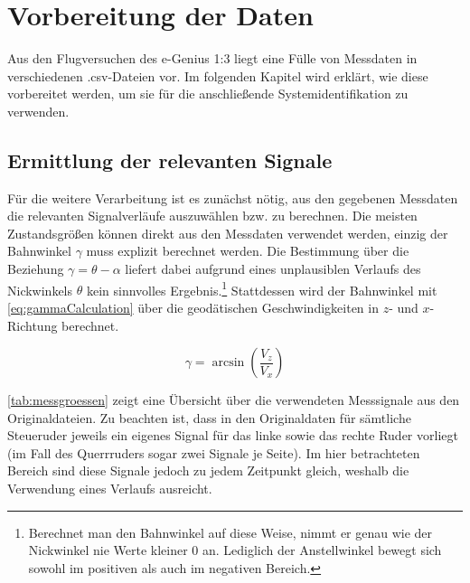 \chapter{Vorbereitung der Daten}
Aus den Flugversuchen des e-Genius 1:3 liegt eine Fülle von Messdaten in verschiedenen .csv-Dateien vor. Im folgenden Kapitel 
wird erklärt, wie diese vorbereitet werden, um sie für die anschließende Systemidentifikation zu verwenden.



\section{Ermittlung der relevanten Signale} %
Für die weitere Verarbeitung ist es zunächst nötig, aus den gegebenen Messdaten die relevanten Signalverläufe auszuwählen 
bzw. zu berechnen. Die meisten Zustandsgrößen können direkt aus den Messdaten verwendet werden, einzig der Bahnwinkel $ 
\gamma $ muss explizit berechnet werden. Die Bestimmung über die Beziehung $ \gamma=\theta-\alpha $ liefert dabei aufgrund 
eines unplausiblen Verlaufs des Nickwinkels $ \theta $ kein sinnvolles Ergebnis.\footnote{Berechnet man den Bahnwinkel auf 
diese Weise, nimmt er genau wie der Nickwinkel nie Werte kleiner 0 an. Lediglich der Anstellwinkel bewegt sich sowohl im 
positiven als auch im negativen Bereich.} Stattdessen wird der Bahnwinkel mit \cref{eq:gammaCalculation} über die 
geodätischen Geschwindigkeiten in $ z $- und $ x $-Richtung berechnet.

\begin{equation}
	\gamma = \arcsin{\left( \frac{V_z}{V_x} \right)}
	\label{eq:gammaCalculation}
\end{equation}

\cref{tab:messgroessen} zeigt eine Übersicht über die verwendeten Messsignale aus den Originaldateien. Zu beachten ist, dass 
in den Originaldaten für sämtliche Steueruder jeweils ein eigenes Signal für das linke sowie das rechte Ruder vorliegt (im 
Fall des Querrruders sogar zwei Signale je Seite). Im hier betrachteten Bereich sind diese Signale jedoch zu jedem Zeitpunkt 
gleich, weshalb die Verwendung eines Verlaufs ausreicht.

